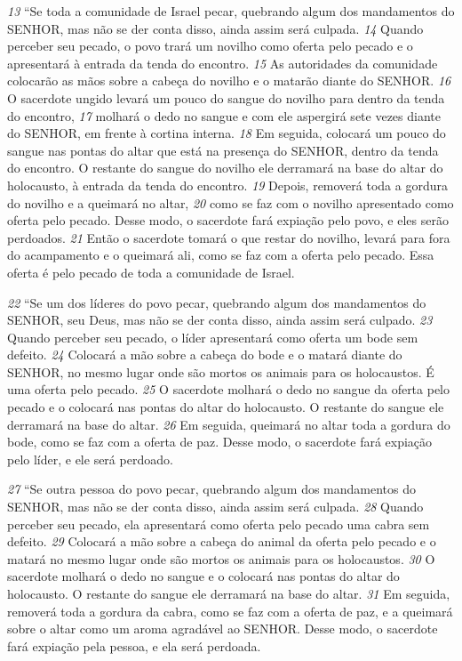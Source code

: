 \smallskip
\textit{\tiny 13}
“Se toda a comunidade de Israel pecar, quebrando algum dos mandamentos
do SENHOR, mas não se der conta disso, ainda assim será culpada. 
\textit{\tiny 14}
Quando
perceber seu pecado, o povo trará um novilho como oferta pelo pecado e o
apresentará à entrada da tenda do encontro. 
\textit{\tiny 15}
As autoridades da comunidade
colocarão as mãos sobre a cabeça do novilho e o matarão diante do SENHOR. 
\textit{\tiny 16}
O
sacerdote ungido levará um pouco do sangue do novilho para dentro da tenda do
encontro, 
\textit{\tiny 17}
molhará o dedo no sangue e com ele aspergirá sete vezes diante do
SENHOR, em frente à cortina interna. 
\textit{\tiny 18}
Em seguida, colocará um pouco do sangue
nas pontas do altar que está na presença do SENHOR, dentro da tenda do encontro.
O restante do sangue do novilho ele derramará na base do altar do holocausto, à
entrada da tenda do encontro. 
\textit{\tiny 19}
Depois, removerá toda a gordura do novilho e a
queimará no altar, 
\textit{\tiny 20}
como se faz com o novilho apresentado como oferta pelo
pecado. Desse modo, o sacerdote fará expiação pelo povo, e eles serão perdoados.
\textit{\tiny 21}
Então o sacerdote tomará o que restar do novilho, levará para fora do
acampamento e o queimará ali, como se faz com a oferta pelo pecado. Essa oferta
é pelo pecado de toda a comunidade de Israel.
   
\smallskip
\textit{\tiny 22}
“Se um dos líderes do povo pecar, quebrando algum dos mandamentos do
SENHOR, seu Deus, mas não se der conta disso, ainda assim será culpado. 
\textit{\tiny 23}
Quando
perceber seu pecado, o líder apresentará como oferta um bode sem defeito.
\textit{\tiny 24}
Colocará a mão sobre a cabeça do bode e o matará diante do SENHOR, no mesmo
lugar onde são mortos os animais para os holocaustos. É uma oferta pelo pecado.
\textit{\tiny 25}
O sacerdote molhará o dedo no sangue da oferta pelo pecado e o colocará nas
pontas do altar do holocausto. O restante do sangue ele derramará na base do
altar. 
\textit{\tiny 26}
Em seguida, queimará no altar toda a gordura do bode, como se faz com a
oferta de paz. Desse modo, o sacerdote fará expiação pelo líder, e ele será
perdoado.
   
\smallskip
\textit{\tiny 27}
“Se outra pessoa do povo pecar, quebrando algum dos mandamentos do
SENHOR, mas não se der conta disso, ainda assim será culpada. 
\textit{\tiny 28}
Quando perceber
seu pecado, ela apresentará como oferta pelo pecado uma cabra sem defeito.
\textit{\tiny 29}
Colocará a mão sobre a cabeça do animal da oferta pelo pecado e o matará no
mesmo lugar onde são mortos os animais para os holocaustos. 
\textit{\tiny 30}
O sacerdote
molhará o dedo no sangue e o colocará nas pontas do altar do holocausto. O
restante do sangue ele derramará na base do altar. 
\textit{\tiny 31}
Em seguida, removerá toda a
gordura da cabra, como se faz com a oferta de paz, e a queimará sobre o altar
como um aroma agradável ao SENHOR. Desse modo, o sacerdote fará expiação pela
pessoa, e ela será perdoada.
   
